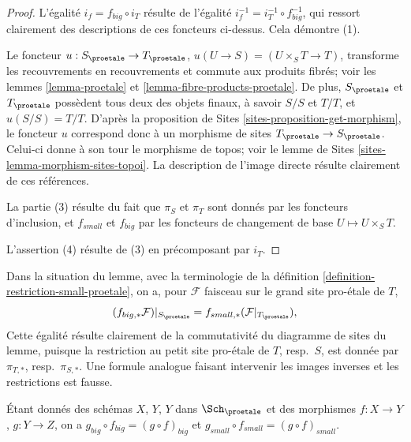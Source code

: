 \begin{proof}
L'égalité $i_f = f_{big} \circ i_T$ résulte de
l'égalité $i_f^{-1} = i_T^{-1} \circ f_{big}^{-1}$, qui ressort
clairement des descriptions de ces foncteurs ci-dessus.
Cela démontre (1).

\medskip\noindent
Le foncteur $u : S_\proetale \to T_\proetale$,
$u(U \to S) = (U \times_S T \to T)$,
transforme les recouvrements en recouvrements et commute aux produits fibrés;
voir les lemmes \ref{lemma-proetale} et \ref{lemma-fibre-products-proetale}.
De plus, $S_\proetale$ et $T_\proetale$ possèdent tous deux des objets finaux,
à savoir $S/S$ et $T/T$, et $u(S/S) = T/T$. D'après la
proposition de Sites \ref{sites-proposition-get-morphism},
le foncteur $u$ correspond donc à un morphisme de sites
$T_\proetale \to S_\proetale$. Celui-ci donne à son tour le
morphisme de topos; voir le
lemme de Sites \ref{sites-lemma-morphism-sites-topoi}. La description
de l'image directe résulte clairement de ces références.

\medskip\noindent
La partie (3) résulte du fait que $\pi_S$ et $\pi_T$ sont donnés par les
foncteurs d'inclusion, et $f_{small}$ et $f_{big}$ par les
foncteurs de changement de base $U \mapsto U \times_S T$.

\medskip\noindent
L'assertion (4) résulte de (3) en précomposant par $i_T$.
\end{proof}

\noindent
Dans la situation du lemme, avec la terminologie de la
définition \ref{definition-restriction-small-proetale},
on a, pour $\mathcal{F}$ faisceau sur le grand site pro-\'etale de $T$,
\begin{equation}
\label{equation-compare-big-small}
(f_{big, *}\mathcal{F})|_{S_\proetale} =
f_{small, *}(\mathcal{F}|_{T_\proetale}),
\end{equation}
Cette égalité résulte clairement de la commutativité du diagramme de
sites du lemme, puisque la restriction au petit site pro-\'etale de
$T$, resp.\ $S$, est donnée par $\pi_{T, *}$, resp.\ $\pi_{S, *}$. Une formule
analogue faisant intervenir les images inverses et les restrictions est fausse.

\begin{lemma}
\label{lemma-composition-proetale}
Étant donnés des schémas $X$, $Y$, $Y$ dans $\Sch_\proetale$
et des morphismes $f : X \to Y$, $g : Y \to Z$, on a
$g_{big} \circ f_{big} = (g \circ f)_{big}$ et
$g_{small} \circ f_{small} = (g \circ f)_{small}$.
\end{lemma}

